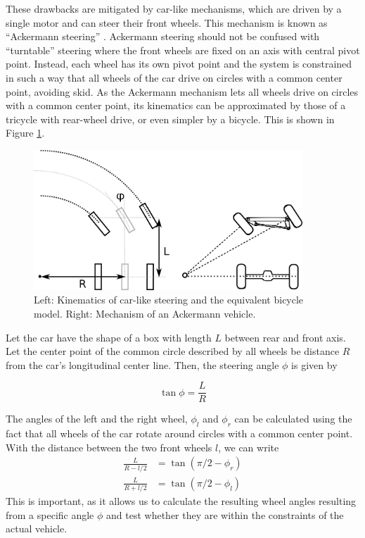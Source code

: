These drawbacks are mitigated by car-like mechanisms, which are driven by a single motor and can steer their front wheels. This mechanism is known as ``Ackermann steering'' . Ackermann steering should not be confused with ``turntable'' steering  where the front wheels are fixed on an axis with central pivot point. Instead, each wheel has its own pivot point and the system is constrained in such a way that all wheels of the car drive on circles with a common center point, avoiding skid. As the Ackermann mechanism lets all wheels drive on circles with a common center point, its kinematics can be approximated by those of a tricycle with rear-wheel drive, or even simpler by a bicycle. This is shown in Figure \ref{fig:ackermann}.

\begin{figure}[htb!]
	\centering
		\includegraphics[width=0.9\textwidth]{figs/ackermann.png}
	\caption{Left: Kinematics of car-like steering and the equivalent bicycle model. Right: Mechanism of an Ackermann vehicle.}
	\label{fig:ackermann}
\end{figure}

Let the car have the shape of a box with length $L$ between rear and front axis. Let the center point of the common circle described by all wheels be distance $ R$ from the car's longitudinal center line.  Then, the steering angle $ \phi$ is given by

\begin{equation}\label{eq:ackermann}
\tan \phi = \frac{L}{R}
\end{equation}

The angles of the left and the right wheel, $ \phi_l$ and $ \phi_r$ can be calculated using the fact that all wheels of the car rotate around circles with a common center point. With the distance between the two front wheels $l$, we can write
\begin{eqnarray}
\frac{L}{R-l/2}&=\tan{(\pi/2-\phi_r)}\\
\frac{L}{R+l/2}&=\tan{(\pi/2-\phi_l)}
\end{eqnarray}
This is important, as it allows us to calculate the resulting wheel angles resulting from a specific angle $\phi$ and test whether they are within the constraints of the actual vehicle.


